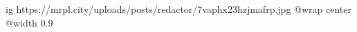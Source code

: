  
 
 
 
 

\ifcmt
  ig https://mrpl.city/uploads/posts/redactor/7vaphx23hzjmafrp.jpg
  @wrap center
  @width 0.9
\fi
